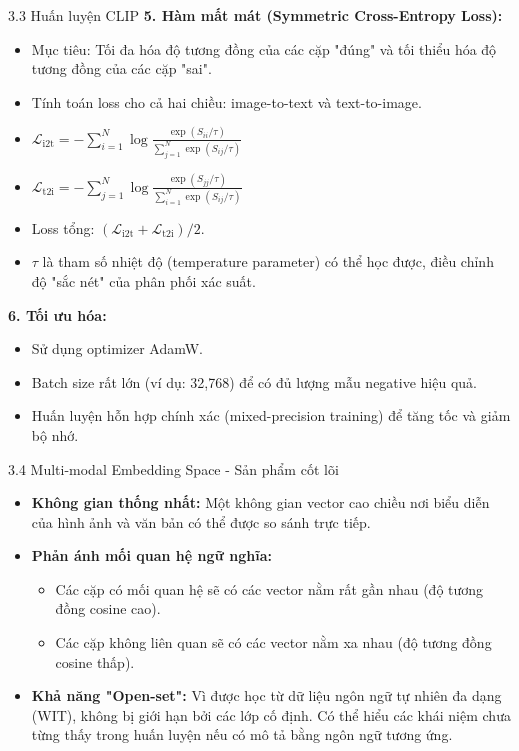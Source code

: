 \begin{frame}{3.3 Huấn luyện CLIP}
    \textbf{5. Hàm mất mát (Symmetric Cross-Entropy Loss):}
    \begin{itemize}
        \item Mục tiêu: Tối đa hóa độ tương đồng của các cặp "đúng" và tối thiểu hóa độ tương đồng của các cặp "sai".
        \item Tính toán loss cho cả hai chiều: image-to-text và text-to-image.
        \item $\mathcal{L}_{\text{i2t}} = -\sum_{i=1}^{N} \log \frac{\exp(S_{ii}/\tau)}{\sum_{j=1}^{N} \exp(S_{ij}/\tau)}$
        \item $\mathcal{L}_{\text{t2i}} = -\sum_{j=1}^{N} \log \frac{\exp(S_{jj}/\tau)}{\sum_{i=1}^{N} \exp(S_{ij}/\tau)}$
        \item Loss tổng: $(\mathcal{L}_{\text{i2t}} + \mathcal{L}_{\text{t2i}})/2$.
        \item $\tau$ là tham số nhiệt độ (temperature parameter) có thể học được, điều chỉnh độ "sắc nét" của phân phối xác suất.
    \end{itemize}

    \textbf{6. Tối ưu hóa:}
    \begin{itemize}
        \item Sử dụng optimizer AdamW.
        \item Batch size rất lớn (ví dụ: 32,768) để có đủ lượng mẫu negative hiệu quả.
        \item Huấn luyện hỗn hợp chính xác (mixed-precision training) để tăng tốc và giảm bộ nhớ.
    \end{itemize}
\end{frame}

\begin{frame}{3.4 Multi-modal Embedding Space - Sản phẩm cốt lõi}
    \begin{itemize}
        \item \textbf{Không gian thống nhất:} Một không gian vector cao chiều nơi biểu diễn của hình ảnh và văn bản có thể được so sánh trực tiếp.
        \item \textbf{Phản ánh mối quan hệ ngữ nghĩa:}
        \begin{itemize}
            \item Các cặp có mối quan hệ sẽ có các vector nằm rất gần nhau (độ tương đồng cosine cao).
            \item Các cặp không liên quan  sẽ có các vector nằm xa nhau (độ tương đồng cosine thấp).
        \end{itemize}
        \item \textbf{Khả năng "Open-set":} Vì được học từ dữ liệu ngôn ngữ tự nhiên đa dạng (WIT), không bị giới hạn bởi các lớp cố định. Có thể hiểu các khái niệm chưa từng thấy trong huấn luyện nếu có mô tả bằng ngôn ngữ tương ứng.
    \end{itemize}
\end{frame}

